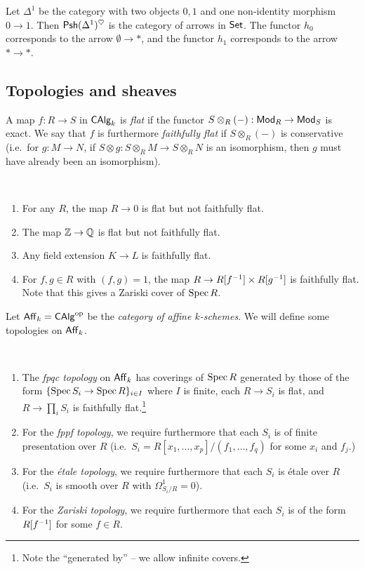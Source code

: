 \documentclass{amsart}
\begin{document}
\begin{ex}
Let $\Delta^1$ be the category with two objects $0, 1$ and one non-identity morphism $0 \to 1$.
Then $\mathsf{Psh}(\Delta^1)^\heartsuit$ is the category of arrows in $\mathsf{Set}$.
The functor $h_0$ corresponds to the arrow $\emptyset \to *$, and the functor $h_1$ corresponds to the arrow $* \to *$.
\end{ex}

\subsection{Topologies and sheaves}

\begin{dfn}
A map $f: R \to S$ in $\mathsf{CAlg}_k$ is \emph{flat} if the functor $S \otimes_R (-): \mathsf{Mod}_R \to \mathsf{Mod}_S$ is exact.
We say that $f$ is furthermore \emph{faithfully flat} if $S \otimes_R (-)$ is conservative (i.e.\ for $g: M \to N$, if $S \otimes g: S \otimes_R M \to S \otimes_R N$ is an isomorphism, then $g$ must have already been an isomorphism).
\end{dfn}

\begin{ex}
\,
\begin{enumerate}
	\item For any $R$, the map $R \to 0$ is flat but not faithfully flat.
	\item The map $\mathbb{Z} \to \mathbb{Q}$ is flat but not faithfully flat.
	\item Any field extension $K \to L$ is faithfully flat.
	\item For $f, g \in R$ with $(f, g) = 1$, the map $R \to R[f^{-1}] \times R[g^{-1}]$ is faithfully flat.
	Note that this gives a Zariski cover of $\operatorname{Spec} R$.
\end{enumerate}
\end{ex}

Let $\mathsf{Aff}_k = \mathsf{CAlg}^{\mathrm{op}}$ be the \emph{category of affine $k$-schemes}.
We will define some topologies on $\mathsf{Aff}_k$.

\begin{dfn}
\,
\begin{enumerate}
	\item The \emph{fpqc topology} on $\mathsf{Aff}_k$ has coverings of $\operatorname{Spec} R$ generated by those of the form $\{ \operatorname{Spec} S_i \to \operatorname{Spec} R\}_{i \in I}$ where $I$ is finite, each $R \to S_i$ is flat, and $R \to \prod_i S_i$ is faithfully flat.\footnote{Note the ``generated by'' -- we allow infinite covers.}
	\item For the \emph{fppf topology}, we require furthermore that each $S_i$ is of finite presentation over $R$ (i.e.\ $S_i = R[x_1, \dots, x_p] / (f_1, \dots, f_q)$ for some $x_i$ and $f_j$.)
	\item For the \emph{\'etale topology}, we require furthermore that each $S_i$ is \'etale over $R$ (i.e.\ $S_i$ is smooth over $R$ with $\Omega^1_{S_i/R} = 0$).
	\item For the \emph{Zariski topology}, we require furthermore that each $S_i$ is of the form $R[f^{-1}]$ for some $f \in R$.
\end{enumerate}
\end{dfn}
\end{document}
